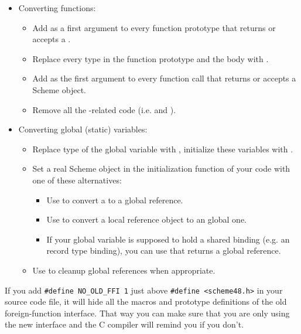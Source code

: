\begin{itemize}
\item Converting functions:
  \begin{itemize}
  \item Add  as a first argument to every
    function prototype that returns or accepts a .

  \item Replace every  type in the function prototype
    and the body with .

  \item Add  as the first argument to every function call
    that returns or accepts a Scheme object.

  \item Remove all the -related code (i.e.
     and ).
  \end{itemize}

\item Converting global (static) variables:
  \begin{itemize}
  \item Replace  type of the global variable with
    , initialize these variables with .

  \item Set a real Scheme object in the initialization function of
    your code with one of these alternatives:
    \begin{itemize}
    \item Use  to convert a
       to a global reference.

    \item Use  to convert a local
      reference object to an global one.

    \item If your global variable is supposed to hold a shared binding
      (e.g. an record type binding), you can use
       that returns a global
      reference.
    \end{itemize}
    
  \item Use  to cleanup global references
    when appropriate.
  \end{itemize}
\end{itemize}

\noindent{}If you add \verb|#define NO_OLD_FFI 1| just above
\verb|#define <scheme48.h>| in your source code file, it will hide all
the macros and prototype definitions of the old foreign-function
interface.  That way you can make sure that you are only using the new
interface and the C compiler will remind you if you don't.

